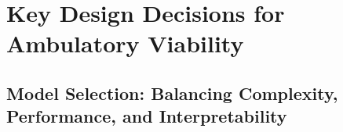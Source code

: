 \section{Key Design Decisions for Ambulatory Viability}

\subsection{Model Selection: Balancing Complexity, Performance, and Interpretability}
